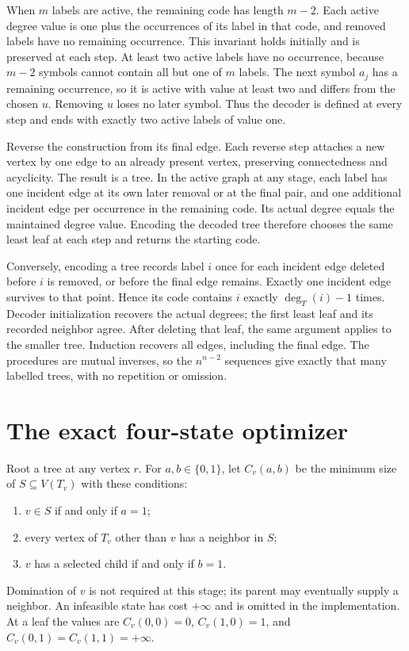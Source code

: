 \documentclass[11pt,a4paper]{article}
\theoremstyle{remark}
\begin{document}
When $m$ labels are active, the remaining code has length $m-2$.
Each active degree value is one plus the occurrences of its label
in that code, and removed labels have no remaining occurrence.
This invariant holds initially and is preserved at each step.
At least two active labels have no occurrence, because $m-2$
symbols cannot contain all but one of $m$ labels. The next symbol
$a_j$ has a remaining occurrence, so it is active with value at
least two and differs from the chosen $u$. Removing $u$ loses no
later symbol. Thus the decoder is defined at every step and ends
with exactly two active labels of value one.

Reverse the construction from its final edge. Each reverse step
attaches a new vertex by one edge to an already present vertex,
preserving connectedness and acyclicity. The result is a tree.
In the active graph at any stage, each label has one incident edge
at its own later removal or at the final pair, and one additional
incident edge per occurrence in the remaining code.
Its actual degree equals the maintained degree value. Encoding
the decoded tree therefore chooses the same least leaf at each
step and returns the starting code.

Conversely, encoding a tree records label $i$ once for each incident
edge deleted before $i$ is removed, or before the final edge remains.
Exactly one incident edge survives to that point. Hence its code
contains $i$ exactly $\deg_T(i)-1$ times.
Decoder initialization recovers the actual degrees; the first
least leaf and its recorded neighbor agree. After deleting that
leaf, the same argument applies to the smaller tree. Induction
recovers all edges, including the final edge. The procedures are
mutual inverses, so the $n^{n-2}$ sequences give exactly that many
labelled trees, with no repetition or omission.

\section{The exact four-state optimizer}
\label{app:dp}

Root a tree at any vertex $r$. For $a,b\in\{0,1\}$, let $C_v(a,b)$
be the minimum size of $S\subseteq V(T_v)$ with these conditions:
\begin{enumerate}
\item $v\in S$ if and only if $a=1$;
\item every vertex of $T_v$ other than $v$ has a neighbor in $S$;
\item $v$ has a selected child if and only if $b=1$.
\end{enumerate}
Domination of $v$ is not required at this stage; its parent may
eventually supply a neighbor. An infeasible state has cost
$+\infty$ and is omitted in the implementation.
At a leaf the values are $C_v(0,0)=0$, $C_v(1,0)=1$, and
$C_v(0,1)=C_v(1,1)=+\infty$.
\end{document}
